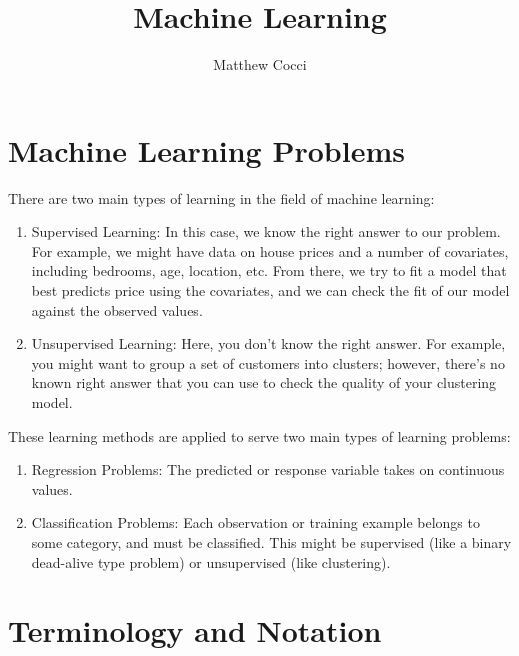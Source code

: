 \documentclass[12pt]{article}
\author{Matthew Cocci}
\title{Machine Learning}
\date{}
\begin{document}
\maketitle


\section{Machine Learning Problems}

There are two main types of learning in the field of machine learning:
\begin{enumerate}

   \item Supervised Learning: In this case, we know the right answer
      to our problem.  For example, we might have data on house prices
      and a number of covariates, including bedrooms, age, location,
      etc.  From there, we try to fit a model that best predicts price
      using the covariates, and we can check the fit of our model 
      against the observed values.

   \item Unsupervised Learning: Here, you don't know the right answer.
      For example, you might want to group a set of customers
      into clusters; however, there's no known right answer that you can
      use to check the quality of your clustering model.

\end{enumerate}
These learning methods are applied to serve two main types of 
learning problems:
\begin{enumerate}
   \item Regression Problems: The predicted or response variable
      takes on continuous values.
   \item Classification Problems: Each observation or training example
      belongs to some category, and must be classified. This might
      be supervised (like a binary dead-alive type problem) or 
      unsupervised (like clustering).
\end{enumerate}



\section{Terminology and Notation}
\end{document}
